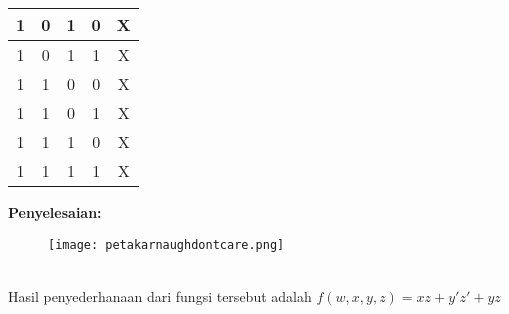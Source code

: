 \documentclass[11pt]{article}
\theoremstyle{definitionstyle}
\theoremstyle{theoremstyle}
\theoremstyle{examplestyle}
\begin{document}
\begin{example}
\begin{center}
\begin{tabular}{|c|c|c|c|c|}
        1          & 0          & 1          & 0          & X                   \\ \hline
        1          & 0          & 1          & 1          & X                   \\ \hline
        1          & 1          & 0          & 0          & X                   \\ \hline
        1          & 1          & 0          & 1          & X                   \\ \hline
        1          & 1          & 1          & 0          & X                   \\ \hline
        1          & 1          & 1          & 1          & X                   \\ \hline
    \end{tabular}
\end{center}
\end{example}
\textbf{Penyelesaian:} \\
\begin{figure}[h]
    \centering
    \texttt{[image: petakarnaughdontcare.png]}
\end{figure} \\
Hasil penyederhanaan dari fungsi tersebut adalah $f(w, x, y, z) = xz + y'z' + yz$ \\
\end{document}
